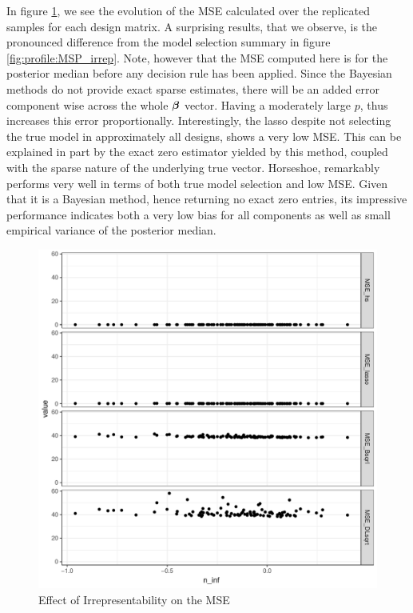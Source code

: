 \documentclass[chapters]{uamaththesis}
\begin{document}
In figure \ref{fig:profile:MSE_irrep}, we see the evolution of the MSE calculated over the replicated samples for each design matrix. A surprising results, that we observe, is the pronounced difference from the model selection summary in figure \ref{fig:profile:MSP_irrep}. Note, however that the MSE computed here is for the posterior median before any decision rule has been applied. Since the Bayesian methods do not provide exact sparse estimates, there will be an added error component wise across the whole $\boldsymbol{\beta}$ vector. Having a moderately large $p$, thus increases this error proportionally. Interestingly, the lasso despite not selecting the true model in approximately all designs, shows a very low MSE. This can be explained in part by the exact zero estimator yielded by this method, coupled with the sparse nature of the underlying true vector. Horseshoe, remarkably performs very well in terms of both true model selection and low MSE. Given that it is a Bayesian method, hence returning no exact zero entries, its impressive performance indicates both a very low bias for all components as well as small empirical variance of the posterior median.
\begin{figure}[ht!]%
\centering
\includegraphics[angle = 90 , origin = c , width=0.95\columnwidth , height =.45\textheight]{Irrep_MSE_selec_n100p60_q50_2groups}%
\caption{Effect of Irrepresentability on the MSE}%
\label{fig:profile:MSE_irrep}%
\end{figure}
\end{document}
